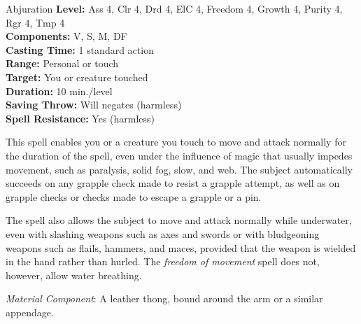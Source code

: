 {Abjuration}
{
	\textbf{Level:}
	Ass 4, Clr 4, Drd 4, ElC 4, Freedom 4, Growth 4, Purity 4, Rgr 4, Tmp 4\\
	\textbf{Components:}
	V, S, M, DF\\
	\textbf{Casting Time:}
	1 standard action\\
	\textbf{Range:}
	Personal or touch\\
	\textbf{Target:}
	You or creature touched\\
	\textbf{Duration:}
	10 min./level\\
	\textbf{Saving Throw:}
	Will negates (harmless)\\
	\textbf{Spell Resistance:}
	Yes (harmless)\\
}
{
	This spell enables you or a creature you touch to move and attack normally for the duration of the spell, even under the influence of magic that usually impedes movement, such as paralysis, solid fog, slow, and web. The subject automatically succeeds on any grapple check made to resist a grapple attempt, as well as on grapple checks or  checks made to escape a grapple or a pin.

	The spell also allows the subject to move and attack normally while underwater, even with slashing weapons such as axes and swords or with bludgeoning weapons such as flails, hammers, and maces, provided that the weapon is wielded in the hand rather than hurled. The \emph{freedom of movement} spell does not, however, allow water breathing.

	\textit{Material Component}:
	A leather thong, bound around the arm or a similar appendage.

}
